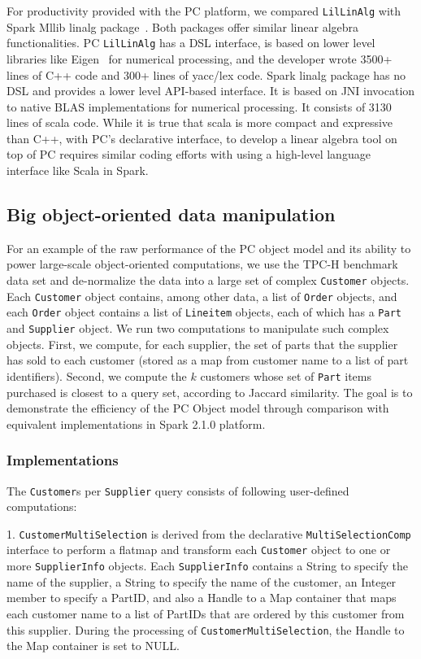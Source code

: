 For productivity provided with the PC platform, we compared
\texttt{LilLinAlg} with Spark Mllib linalg
package~\cite{bosagh2016matrix}. Both packages offer similar linear algebra
functionalities. PC \texttt{LilLinAlg} has a DSL interface, is based on lower level
libraries like Eigen~\cite{eigen} for numerical processing, and the developer 
wrote 3500+
lines of C++ code and 300+ lines of yacc/lex code. Spark linalg
package has no DSL and provides a lower level API-based interface. It
is based on JNI invocation to native BLAS implementations for
numerical processing. It consists of 3130 lines of scala
code. While it is true that scala is more compact and expressive
than C++, with PC's declarative interface, to develop a linear algebra
tool on top of PC requires similar coding efforts with using a
high-level language interface like Scala in Spark.



\subsection{Big object-oriented data manipulation}
For an example of the raw performance of the PC object model and its ability to power large-scale 
object-oriented computations, we use the TPC-H benchmark data set \cite{council2008tpc}
and de-normalize
the data into a large set of complex \texttt{Customer} objects. Each
\texttt{Customer} object contains, among
other data, a list
of \texttt{Order} objects, and each \texttt{Order} object contains a list of \texttt{Lineitem} objects,
each of which has a \texttt{Part} and \texttt{Supplier} object.  
We run two computations to manipulate such complex objects. First, we compute, for each supplier,
the set of parts that the supplier has sold to each customer (stored
as a map from customer name to a list of part identifiers).
Second, we compute the $k$ customers whose set of \texttt{Part} items purchased is closest to
a query set, according to Jaccard similarity.
The goal is to demonstrate the efficiency of the PC
Object model through comparison with equivalent implementations in Spark 2.1.0 platform.

\subsubsection{Implementations}
The \texttt{Customer}s per \texttt{Supplier} query consists of
following user-defined computations:  

\vspace{5pt}
1. \texttt{CustomerMultiSelection} is derived from the
declarative \texttt{MultiSelectionComp} interface to perform a flatmap
and transform each \texttt{Customer} object to one or more
\texttt{SupplierInfo} objects. Each \texttt{SupplierInfo} contains a
String to specify the name of the supplier, a String to
specify the name of the customer, an Integer member to specify a PartID, and
also a Handle to a Map container that maps each customer name to a list of PartIDs
that are
ordered by this customer from this supplier. During the processing of
\texttt{CustomerMultiSelection}, the Handle to the Map container is
set to NULL.


